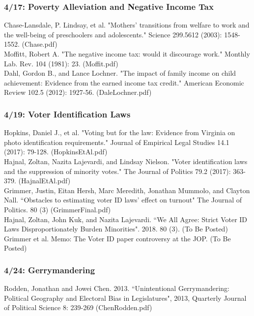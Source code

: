 \documentclass[12pt,letterpaper]{article}
\numberwithin{equation}{section}
\begin{document}
\subsubsection{4/17: Poverty Alleviation and Negative Income Tax}

\noindent Chase-Lansdale, P. Lindsay, et al. "Mothers' transitions from welfare to work and the well-being of preschoolers and adolescents." Science 299.5612 (2003): 1548-1552. (Chase.pdf)\\

\noindent Moffitt, Robert A. "The negative income tax: would it discourage work." Monthly Lab. Rev. 104 (1981): 23. (Moffit.pdf)\\

\noindent Dahl, Gordon B., and Lance Lochner. "The impact of family income on child achievement: Evidence from the earned income tax credit." American Economic Review 102.5 (2012): 1927-56. (DaleLochner.pdf)\\

\subsubsection{4/19:  Voter Identification Laws} 
\noindent Hopkins, Daniel J., et al. "Voting but for the law: Evidence from Virginia on photo identification requirements." Journal of Empirical Legal Studies 14.1 (2017): 79-128. (HopkinsEtAl.pdf)\\

\noindent Hajnal, Zoltan, Nazita Lajevardi, and Lindsay Nielson. "Voter identification laws and the suppression of minority votes." The Journal of Politics 79.2 (2017): 363-379. (HajnalEtAl.pdf)\\

\noindent Grimmer, Justin, Eitan Hersh, Marc Meredith, Jonathan Mummolo, and Clayton Nall. ``Obstacles  to estimating voter ID laws' effect on turnout" The Journal of Politics. 80 (3) (GrimmerFinal.pdf)\\

\noindent Hajnal, Zoltan, John Kuk, and Nazita Lajevardi. ``We All Agree: Strict Voter ID Laws Disproportionately Burden Minorities". 2018. 80 (3). (To Be Posted) \\

\noindent Grimmer et al.  Memo: The Voter ID paper controversy at the JOP.  (To Be Posted)\\

\subsubsection{4/24: Gerrymandering} 
\noindent Rodden, Jonathan and Jowei Chen. 2013. ``Unintentional Gerrymandering: Political Geography and Electoral Bias in Legislatures", 2013, Quarterly
Journal of Political Science 8: 239-269 (ChenRodden.pdf) \\
\end{document}
